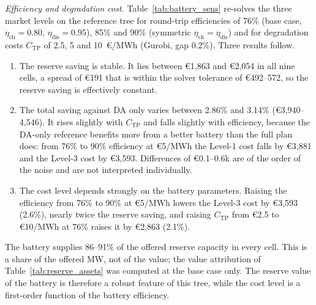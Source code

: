 \documentclass[5p,times,twocolumn]{elsarticle}
\begin{document}
\textit{Efficiency and degradation cost.} Table~\ref{tab:battery_sens} re-solves the three market levels on the reference tree for round-trip efficiencies of 76\% (base case, $\eta_{\text{ch}}=0.80$, $\eta_{\text{dis}}=0.95$), 85\% and 90\% (symmetric $\eta_{\text{ch}}=\eta_{\text{dis}}$) and for degradation costs $C_{\text{TP}}$ of 2.5, 5 and 10~\euro/MWh (Gurobi, gap 0.2\%). Three results follow.
\begin{enumerate}
    \item The reserve saving is stable. It lies between \euro 1,863 and \euro 2,054 in all nine cells, a spread of \euro 191 that is within the solver tolerance of \euro 492--572, so the reserve saving is effectively constant.
    \item The total saving against DA only varies between 2.86\% and 3.14\% (\euro 3,940--4,546). It rises slightly with $C_{\text{TP}}$ and falls slightly with efficiency, because the DA-only reference benefits more from a better battery than the full plan does: from 76\% to 90\% efficiency at \euro 5/MWh the Level-1 cost falls by \euro 3,881 and the Level-3 cost by \euro 3,593. Differences of \euro 0.1--0.6k are of the order of the noise and are not interpreted individually.
    \item The cost level depends strongly on the battery parameters. Raising the efficiency from 76\% to 90\% at \euro 5/MWh lowers the Level-3 cost by \euro 3,593 (2.6\%), nearly twice the reserve saving, and raising $C_{\text{TP}}$ from \euro 2.5 to \euro 10/MWh at 76\% raises it by \euro 2,863 (2.1\%).
\end{enumerate}
The battery supplies 86--91\% of the offered reserve capacity in every cell. This is a share of the offered MW, not of the value; the value attribution of Table~\ref{tab:reserve_assets} was computed at the base case only. The reserve value of the battery is therefore a robust feature of this tree, while the cost level is a first-order function of the battery efficiency.
\end{document}
